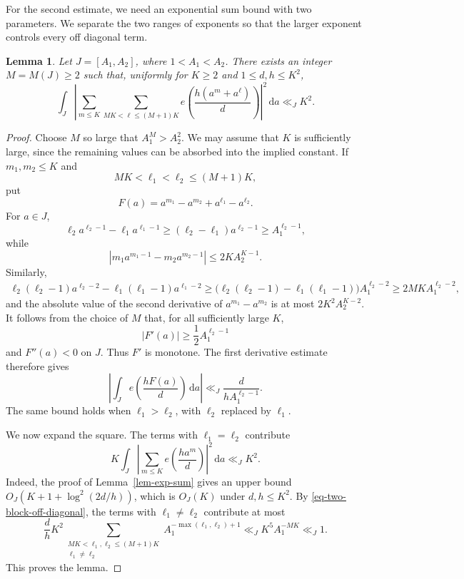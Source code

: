 \documentclass[11pt,reqno]{amsart}
\numberwithin{equation}{section}
\newtheorem{lemma}[theorem]{Lemma}
\begin{document}
    For the second estimate, we need an exponential sum bound with two parameters. We separate the two ranges of exponents so that the larger exponent controls every off diagonal term.

    \begin{lemma}\label{lem-two-block-exp-sum}
        Let $J=[A_1,A_2]$, where $1<A_1<A_2$. There exists an integer $M=M(J)\ge2$ such that, uniformly for $K\ge2$ and $1\le d,h\le K^2$,
        $$
        \int_J
        \left|
        \sum_{m\le K}
        \sum_{MK<\ell\le(M+1)K}
        e\left(\frac{h(a^m+a^\ell)}d\right)
        \right|^2\,\mathrm{d}a
        \ll_J K^2.
        $$
    \end{lemma}

    \begin{proof}
        Choose $M$ so large that $A_1^M>A_2^2$. We may assume that $K$ is sufficiently large, since the remaining values can be absorbed into the implied constant. If $m_1,m_2\le K$ and
        $$
        MK<\ell_1<\ell_2\le(M+1)K,
        $$
        put
        $$
        F(a)=a^{m_1}-a^{m_2}+a^{\ell_1}-a^{\ell_2}.
        $$
        For $a\in J$,
        $$
        \ell_2a^{\ell_2-1}-\ell_1a^{\ell_1-1}
        \ge (\ell_2-\ell_1)a^{\ell_2-1}
        \ge A_1^{\ell_2-1},
        $$
        while
        $$
        \left|m_1a^{m_1-1}-m_2a^{m_2-1}\right|
        \le 2KA_2^{K-1}.
        $$
        Similarly,
        $$
        \begin{aligned}
        \ell_2(\ell_2-1)a^{\ell_2-2}
        -\ell_1(\ell_1-1)a^{\ell_1-2}
        \ge
        \bigl(\ell_2(\ell_2-1)-\ell_1(\ell_1-1)\bigr)
        A_1^{\ell_2-2}
        \ge 2MKA_1^{\ell_2-2},
        \end{aligned}
        $$
        and the absolute value of the second derivative of $a^{m_1}-a^{m_2}$ is at most $2K^2A_2^{K-2}$. It follows from the choice of $M$ that, for all sufficiently large $K$,
        $$
        |F'(a)|\ge \frac12A_1^{\ell_2-1}
        $$
        and $F''(a)<0$ on $J$. Thus $F'$ is monotone. The first derivative estimate therefore gives
        \begin{equation}\label{eq-two-block-off-diagonal}
        \left|
        \int_J e\left(\frac{hF(a)}d\right)\,\mathrm{d}a
        \right|
        \ll_J \frac{d}{hA_1^{\ell_2-1}}.
        \end{equation}
        The same bound holds when $\ell_1>\ell_2$, with $\ell_2$ replaced by $\ell_1$.

        We now expand the square. The terms with $\ell_1=\ell_2$ contribute
        $$
        K\int_J
        \left|\sum_{m\le K}e\left(\frac{ha^m}d\right)\right|^2\,\mathrm{d}a
        \ll_J K^2.
        $$
        Indeed, the proof of Lemma~\ref{lem-exp-sum} gives an upper bound $O_J(K+1+\log^2(2d/h))$, which is $O_J(K)$ under $d,h\le K^2$. By \eqref{eq-two-block-off-diagonal}, the terms with $\ell_1\ne\ell_2$ contribute at most
        $$
        \frac dh K^2
        \sum_{\substack{MK<\ell_1,\ell_2\le(M+1)K\\
        \ell_1\ne\ell_2}}
        A_1^{-\max(\ell_1,\ell_2)+1}
        \ll_J K^5A_1^{-MK}
        \ll_J1.
        $$
        This proves the lemma.
    \end{proof}
\end{document}
